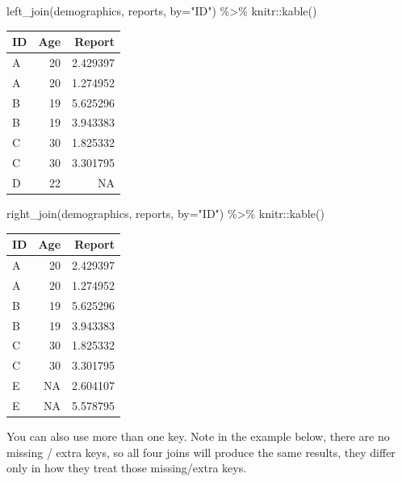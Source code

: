 \documentclass[
]{book}
\newenvironment{Shaded}{\begin{snugshade}}{\end{snugshade}}
\newcommand{\AttributeTok}[1]{\textcolor[rgb]{0.77,0.63,0.00}{#1}}
\newcommand{\FunctionTok}[1]{\textcolor[rgb]{0.00,0.00,0.00}{#1}}
\newcommand{\NormalTok}[1]{#1}
\newcommand{\SpecialCharTok}[1]{\textcolor[rgb]{0.00,0.00,0.00}{#1}}
\newcommand{\StringTok}[1]{\textcolor[rgb]{0.31,0.60,0.02}{#1}}
\begin{document}
\begin{Shaded}
\begin{Highlighting}[]
\FunctionTok{left\_join}\NormalTok{(demographics, reports, }\AttributeTok{by=}\StringTok{"ID"}\NormalTok{) }\SpecialCharTok{\%\textgreater{}\%}
\NormalTok{  knitr}\SpecialCharTok{::}\FunctionTok{kable}\NormalTok{()}
\end{Highlighting}
\end{Shaded}

\begin{tabular}{l|r|r}
\hline
ID & Age & Report\\
\hline
A & 20 & 2.429397\\
\hline
A & 20 & 1.274952\\
\hline
B & 19 & 5.625296\\
\hline
B & 19 & 3.943383\\
\hline
C & 30 & 1.825332\\
\hline
C & 30 & 3.301795\\
\hline
D & 22 & NA\\
\hline
\end{tabular}

\begin{Shaded}
\begin{Highlighting}[]
\FunctionTok{right\_join}\NormalTok{(demographics, reports, }\AttributeTok{by=}\StringTok{"ID"}\NormalTok{) }\SpecialCharTok{\%\textgreater{}\%}
\NormalTok{  knitr}\SpecialCharTok{::}\FunctionTok{kable}\NormalTok{()}
\end{Highlighting}
\end{Shaded}

\begin{tabular}{l|r|r}
\hline
ID & Age & Report\\
\hline
A & 20 & 2.429397\\
\hline
A & 20 & 1.274952\\
\hline
B & 19 & 5.625296\\
\hline
B & 19 & 3.943383\\
\hline
C & 30 & 1.825332\\
\hline
C & 30 & 3.301795\\
\hline
E & NA & 2.604107\\
\hline
E & NA & 5.578795\\
\hline
\end{tabular}

You can also use more than one key. Note in the example below, there are no missing / extra keys, so all four joins will produce the same results, they differ only in how they treat those missing/extra keys.
\end{document}

